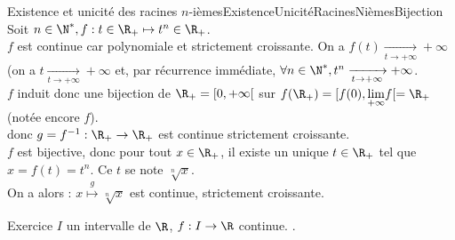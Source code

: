 \documentclass[12pt,a4paper]{report}
\begin{document}
\begin{application}{Existence et unicité des racines $n$-ièmes}{ExistenceUnicitéRacinesNièmesBijection}
Soit $n \in \N^*, f : t \in \R_+ \mapsto t^n \in \R_+$. \\
$f$ est continue car polynomiale et strictement croissante.
On a $f(t) \xrightarrow[t \to +\infty]{} +\infty$ (on a $t \xrightarrow[t \to +\infty]{} +\infty$ et, par récurrence immédiate, $\forall n \in \N^*, t^n \xrightarrow[t \to +\infty]{} +\infty$. \\
$f$ induit donc une bijection de $\R_+ = [0,+\infty[$ sur $f(\R_+) = [f(0), \underset{+\infty}{\lim} f[ = \R_+$ (notée encore $f$). \\
donc $g = f^{-1} : \R_+ \to \R_+$ est continue strictement croissante. \\
$f$ est bijective, donc pour tout $x \in \R_+$, il existe un unique $t \in \R_+$ tel que $x=f(t)=t^n$. Ce $t$ se note $\sqrt[n]{x}$. \\
On a alors : $x \overset{g}{\mapsto} \sqrt[n]{x}$ est continue, strictement croissante.
\end{application}

\begin{application}{Exercice}{}
$I$ un intervalle de $\R$, $f : I \to \R$ continue. .
\end{application}
\end{document}
